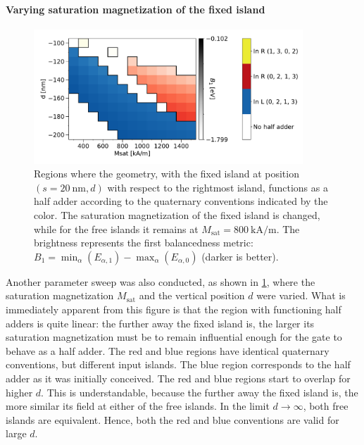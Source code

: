 \documentclass[11pt,a4paper,english,twoside]{article}
\begin{document}
\paragraph{Varying saturation magnetization of the fixed island}
\begin{figure}[b!]
    \centering
    \includegraphics[width=0.9\textwidth]{Figures/half_adder/sweep/000006_d-Msat/table(d100-200_10,Msat3e5-15e5_1e5)_balanced1.pdf}
    \caption{Regions where the geometry, with the fixed island at position $(s=\SI{20}{\nano\metre}, d)$ with respect to the rightmost island, functions as a half adder according to the quaternary conventions indicated by the color. The saturation magnetization of the fixed island is changed, while for the free islands it remains at $M_\mathrm{sat} = \SI{800}{\kilo\ampere\per\metre}$. The brightness represents the first balancedness metric: $B_1 = \min_\alpha(E_{\alpha,1}) - \max_\alpha(E_{\alpha,0})$ (darker is better).} 
    \label{fig:HalfAdder_000006_sweep_d-Msat_balanced1}
\end{figure}
Another parameter sweep was also conducted, as shown in \cref{fig:HalfAdder_000006_sweep_d-Msat_balanced1}, where the saturation magnetization $M_\mathrm{sat}$ and the vertical position $d$ were varied. What is immediately apparent from this figure is that the region with functioning half adders is quite linear: the further away the fixed island is, the larger its saturation magnetization must be to remain influential enough for the gate to behave as a half adder. The red and blue regions have identical quaternary conventions, but different input islands. The blue region corresponds to the half adder as it was initially conceived. The red and blue regions start to overlap for higher $d$. This is understandable, because the further away the fixed island is, the more similar its field at either of the free islands. In the limit $d\rightarrow\infty$, both free islands are equivalent. Hence, both the red and blue conventions are valid for large $d$. \par
\end{document}
